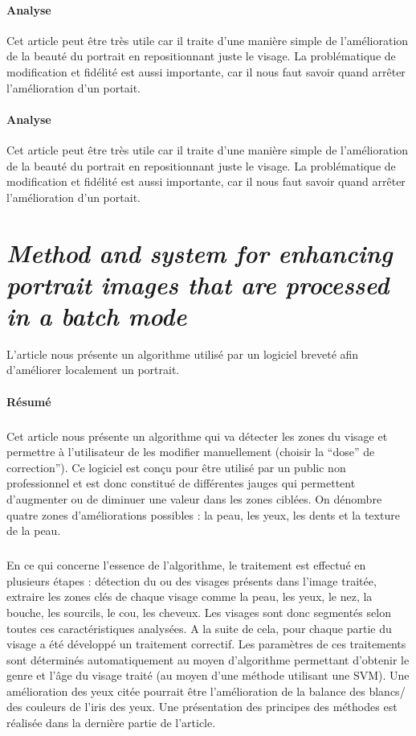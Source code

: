 \documentclass[11pt, french]{report-rd-info}
\begin{document}
\paragraph{Analyse}
Cet article peut être très utile car il traite d'une manière simple de l'amélioration de la beauté du portrait en repositionnant juste le visage. La problématique de modification et fidélité est aussi importante, car il nous faut savoir quand arrêter l'amélioration d'un portait.
\paragraph{Analyse}
Cet article peut être très utile car il traite d'une manière simple de l'amélioration de la beauté du portrait en repositionnant juste le visage. La problématique de modification et fidélité est aussi importante, car il nous faut savoir quand arrêter l'amélioration d'un portait.
\section{\emph{Method and system for enhancing portrait images that are processed in a batch mode}}
L'article \cite{Matraszek2004} nous présente un algorithme utilisé par un logiciel breveté afin d'améliorer localement un portrait.
\paragraph{Résumé}
\subparagraph{}
Cet article nous présente un algorithme qui va détecter les zones du visage et permettre à l'utilisateur de les modifier manuellement (choisir la “dose” de correction”). Ce logiciel est conçu pour être utilisé par un public non professionnel et est donc constitué de différentes jauges qui permettent d'augmenter ou de diminuer une valeur dans les zones ciblées. On dénombre quatre zones d'améliorations possibles : la peau, les yeux, les dents et la texture de la peau.
\subparagraph{}
En ce qui concerne l’essence de l’algorithme, le traitement est effectué en plusieurs étapes : détection du ou des visages présents dans l’image traitée, extraire les zones clés de chaque visage comme la peau, les yeux, le nez, la bouche, les sourcils, le cou, les cheveux. Les visages sont donc segmentés selon toutes ces caractéristiques analysées. A la suite de cela, pour chaque partie du visage a été développé un traitement correctif. Les paramètres de ces traitements sont déterminés automatiquement au moyen d’algorithme permettant d’obtenir le genre et l’âge du visage traité (au moyen d’une méthode utilisant une SVM).
Une amélioration des yeux citée pourrait être l’amélioration de la balance des blancs/ des couleurs de l’iris des yeux. Une présentation des principes des méthodes est réalisée dans la dernière partie de l’article.
\end{document}
